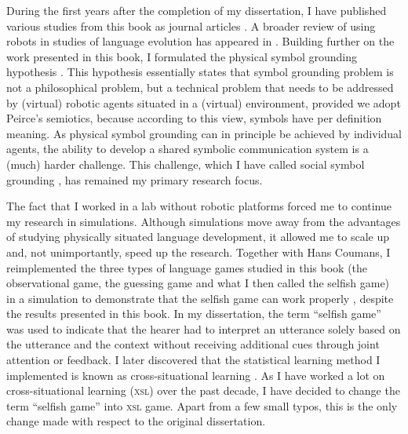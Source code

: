 During the first years after the completion of my dissertation, I have published various studies from this book as journal articles \citep{vogt:2000c,vogt:2002a,vogt:2003a}. A broader review of using robots in studies of language evolution has appeared in \citealt{vogt:2006a}. Building further on the work presented in this book, I formulated the {\sc physical symbol grounding hypothesis} \citep{vogt:2002a}. This hypothesis essentially states that  symbol grounding problem is not a philosophical problem, but a technical problem that needs to be addressed by (virtual) robotic agents situated in a (virtual) environment, provided we adopt Peirce's semiotics, because according to this view, symbols have per definition meaning. As physical symbol grounding can in principle be achieved by individual agents, the ability to develop a shared symbolic communication system is a (much) harder challenge. This challenge, which I have called {\sc social symbol grounding} \citep{vogtdivina:2007}, has remained my primary research focus.

The fact that I worked in a lab without robotic platforms forced me to continue my research in simulations. Although simulations move away from the advantages of studying physically situated language development, it allowed me to scale up and, not unimportantly, speed up the research. 
Together with Hans Coumans, I reimplemented the three types of language games studied in this book (the observational game, the guessing game and what I then called the selfish game) in a simulation to demonstrate that the selfish game can work properly \citep{vogtcoumans:2003}, despite the results presented in this book. In my dissertation, the term ``selfish game'' was used to indicate that the hearer had to interpret an utterance solely based on the utterance and the context without receiving additional cues through joint attention or feedback. I later discovered that the statistical learning method I implemented is known as {\sc cross-situational learning} \citep{pinker:1989,siskind:1996}. As I have worked a lot on cross-situational learning {\scshape (xsl)} over the past decade, I have decided to change the term ``selfish game'' into {\scshape xsl} game. Apart from a few small typos, this is the only change made with respect to the original dissertation.


